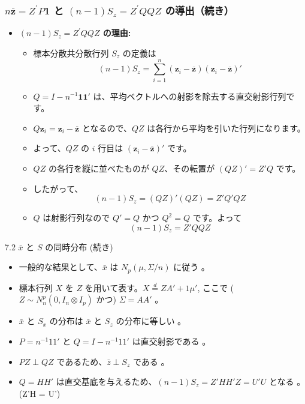 \documentclass{beamer}
\begin{document}
\begin{frame}
\frametitle{$n\overline{\bm{z}}=Z^{\prime}P\bm{1}$ と $(n-1)S_z=Z^{\prime}QQZ$ の導出（続き）}
\begin{itemize}
    \item \textbf{$(n-1)S_z=Z^{\prime}QQZ$ の理由:}
    \begin{itemize}
        \item 標本分散共分散行列 $S_z$ の定義は
        \[
        (n-1)S_z = \sum_{i=1}^{n} (\bm{z}_i - \overline{\bm{z}})(\bm{z}_i - \overline{\bm{z}})'
        \]
        \item $Q = I - n^{-1}\bm{1}\bm{1}'$ は、平均ベクトルへの射影を除去する直交射影行列です。
        \item $Q\bm{z}_i = \bm{z}_i - \overline{\bm{z}}$ となるので、$QZ$ は各行から平均を引いた行列になります。
        \item よって、$QZ$ の $i$ 行目は $(\bm{z}_i - \overline{\bm{z}})'$ です。
        \item $QZ$ の各行を縦に並べたものが $QZ$、その転置が $(QZ)' = Z'Q$ です。
        \item したがって、
        \[
        (n-1)S_z = (QZ)'(QZ) = Z'Q'QZ
        \]
        \item $Q$ は射影行列なので $Q' = Q$ かつ $Q^2 = Q$ です。よって
        \[
        (n-1)S_z = Z'QQZ
        \]
    \end{itemize}
\end{itemize}
\end{frame}

\begin{frame}{7.2 $\bar{x}$ と $S$ の同時分布 (続き)}
\begin{itemize}
    \item 一般的な結果として、$\bar{x}$ は $N_p(\mu, \Sigma/n)$ に従う 。
    \item 標本行列 $X$ を $Z$ を用いて表す。$X \overset{d}{=} ZA' + 1\mu'$, ここで ($Z \sim N_n^p(0, I_n \otimes I_p)$ かつ) $\Sigma=AA'$ 。
    \item $\bar{x}$ と $S_x$ の分布は $\bar{x}$ と $S_z$ の分布に等しい 。
    \item $P=n^{-1}11'$ と $Q=I-n^{-1}11'$ は直交射影である 。
    \item $PZ \perp QZ$ であるため、$\bar{z} \perp S_z$ である 。
    \item $Q=HH'$ は直交基底を与えるため、$(n-1)S_z = Z'HH'Z = U'U$ となる 。\\
    (Z'H = U')
\end{itemize}
\end{frame}
\end{document}
